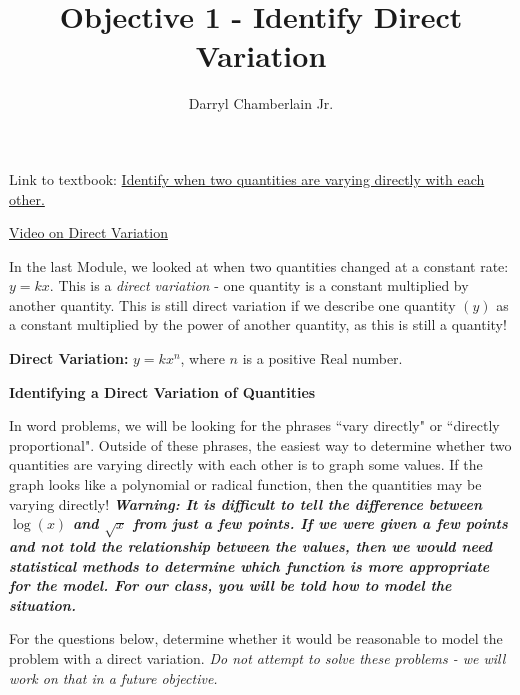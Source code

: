 \documentclass{ximera}
\author{Darryl Chamberlain Jr.}
\title{Objective 1 - Identify Direct Variation}
\begin{document}
\begin{abstract}

\end{abstract}

\maketitle
 
Link to textbook: 
\href{https://cnx.org/contents/mwjClAV_@8.12:yUH0hROr@12/Modeling-Using-Variation}{Identify when two quantities are varying directly with each other.}

\href{https://www.youtube.com/watch?v=oL5kQ8KH_70&list=PLsCqF7qYpC5aHckH-Nh5nF3A598qhRJ8S&index=2}{Video on Direct Variation}
 

In the last Module, we looked at when two quantities changed at a constant rate: $y=kx$. This is a \textit{direct variation} - one quantity is a constant multiplied by another quantity. This is still direct variation if we describe one quantity $(y)$ as a constant multiplied by the power of another quantity, as this is still a quantity! 

\textbf{Direct Variation:} $y = k x^n$, where $n$ is a positive Real number. 

\textbf{Identifying a Direct Variation of Quantities}

In word problems, we will be looking for the phrases ``vary directly" or ``directly proportional". Outside of these phrases, the easiest way to determine whether two quantities are varying directly with each other is to graph some values. If the graph looks like a polynomial or radical function, then the quantities may be varying directly! \textbf{\textit{Warning: It is difficult to tell the difference between $\log{(x)}$ and $\sqrt{x}$ from just a few points. If we were given a few points and not told the relationship between the values, then we would need statistical methods to determine which function is more appropriate for the model. For our class, you will be told how to model the situation.}} 

For the questions below, determine whether it would be reasonable to model the problem with a direct variation. \textit{Do not attempt to solve these problems - we will work on that in a future objective.}
\end{document}
